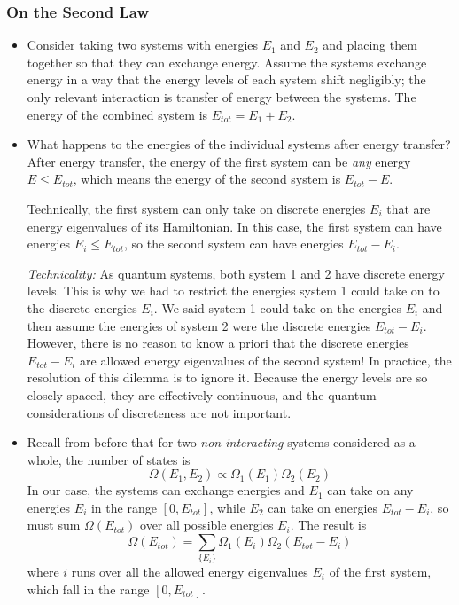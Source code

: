 \documentclass[11pt, a4paper]{article}
\begin{document}
\subsubsection{On the Second Law}
\begin{itemize}
	\item Consider taking two systems with energies $ E_{1} $ and $ E_{2} $ and placing them together so that they can exchange energy. Assume the systems exchange energy in a way that the energy levels of each system shift negligibly; the only relevant interaction is transfer of energy between the systems. The energy of the combined system is $ E_{tot} = E_{1} + E_{2} $.
	
	\item  What happens to the energies of the individual systems after energy transfer? After energy transfer, the energy of the first system can be \textit{any} energy $ E \leq E_{tot} $, which means the energy of the second system is $ E_{tot} - E $. 
	
	Technically, the first system can only take on discrete energies $ E_{i} $ that are energy eigenvalues of its Hamiltonian. In this case, the first system can have energies $ E_{i} \leq E_{tot} $, so the second system can have energies $ E_{tot} - E_{i} $. 
	
	\textit{Technicality:} As quantum systems, both system 1 and 2 have discrete energy levels. This is why we had to restrict the energies system 1 could take on to the discrete energies $ E_{i} $. We said system 1 could take on the energies $ E_{i} $ and then assume the energies of system 2 were the discrete energies $ E_{tot} - E_{i} $. However, there is no reason to know a priori that the discrete energies $ E_{tot} - E_{i} $ are allowed energy eigenvalues of the second system! In practice, the resolution of this dilemma is to ignore it. Because the energy levels are so closely spaced, they are effectively continuous, and the quantum considerations of discreteness are not important.
	
	\item Recall from before that for two \textit{non-interacting} systems considered as a whole, the number of states is 
	\begin{equation*}
		\Omega(E_{1}, E_{2}) \propto \Omega_{1}(E_{1})\Omega_{2}(E_{2})
	\end{equation*}
	In our case, the systems can exchange energies and $ E_{1} $ can take on any energies $ E_{i} $ in the range $ [0, E_{tot}] $, while $ E_{2} $ can take on energies $ E_{tot} - E_{i} $, so must sum $ \Omega(E_{tot}) $ over all possible energies $ E_{i} $. The result is 
	\begin{equation*}
		\Omega(E_{tot}) = \sum_{\{E_{i}\}}\Omega_{1}(E_{i})\Omega_{2}(E_{tot} - E_{i})
	\end{equation*}
	where $ i $ runs over all the allowed energy eigenvalues $ E_{i} $ of the first system, which fall in the range $ [0, E_{tot}] $.
	

\end{itemize}
\end{document}
